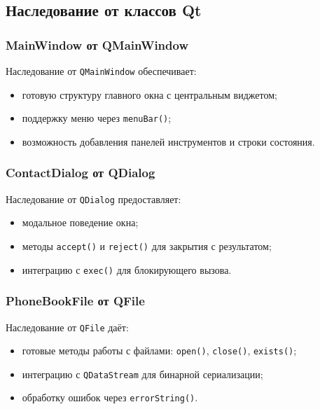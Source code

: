 \subsection{Наследование от классов Qt}

\subsubsection*{MainWindow от QMainWindow}

Наследование от \texttt{QMainWindow} обеспечивает:
\begin{itemize}
    \item готовую структуру главного окна с центральным виджетом;
    \item поддержку меню через \texttt{menuBar()};
    \item возможность добавления панелей инструментов и строки состояния.
\end{itemize}

\subsubsection*{ContactDialog от QDialog}

Наследование от \texttt{QDialog} предоставляет:
\begin{itemize}
    \item модальное поведение окна;
    \item методы \texttt{accept()} и \texttt{reject()} для закрытия с результатом;
    \item интеграцию с \texttt{exec()} для блокирующего вызова.
\end{itemize}

\subsubsection*{PhoneBookFile от QFile}

Наследование от \texttt{QFile} даёт:
\begin{itemize}
    \item готовые методы работы с файлами: \texttt{open()}, \texttt{close()}, \texttt{exists()};
    \item интеграцию с \texttt{QDataStream} для бинарной сериализации;
    \item обработку ошибок через \texttt{errorString()}.
\end{itemize}